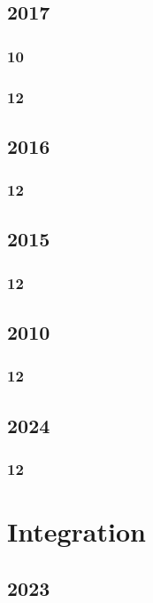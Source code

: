 \documentclass[11pt]{book}
\begin{document}
\section{2017}
\subsection{10}

\subsection{12}


\section{2016}
\subsection{12}



\section{2015}
\subsection{12}


\section{2010}
\subsection{12}


\section{2024}
\subsection{12}





\chapter{Integration}
\section{2023}
\end{document}
